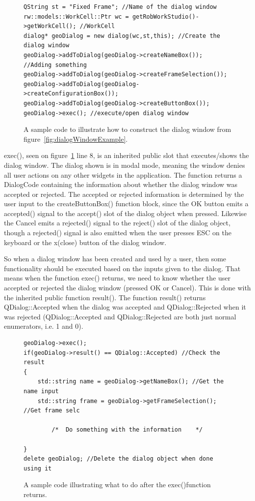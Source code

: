 \begin{figure}[h] %
\centering
\lstset{language=C++} 
\begin{lstlisting}[frame=single]  
QString st = "Fixed Frame"; //Name of the dialog window
rw::models::WorkCell::Ptr wc = getRobWorkStudio()->getWorkCell(); //WorkCell
dialog* geoDialog = new dialog(wc,st,this); //Create the dialog window
geoDialog->addToDialog(geoDialog->createNameBox()); //Adding something
geoDialog->addToDialog(geoDialog->createFrameSelection());
geoDialog->addToDialog(geoDialog->createConfigurationBox());
geoDialog->addToDialog(geoDialog->createButtonBox());	
geoDialog->exec(); //execute/open dialog window	 
\end{lstlisting}
\caption{A sample code to illustrate how to construct the dialog window from figure~\ref{fig:dialogWindowExample}.}
\label{fig:dialogWindowCode} 	
\end{figure}

exec(), seen on figure~\ref{fig:dialogWindowCode} line 8, is an inherited public slot that executes/shows the dialog window. The dialog shown is in modal mode, meaning the window denies all user actions on any other widgets in the application. The function returns a DialogCode containing the information about whether the dialog window was accepted or rejected. The accepted or rejected information is determined by the user input to the createButtonBox() function block, since the OK button emits a accepted() signal to the accept() slot of the dialog object when pressed. Likewise the Cancel emits a rejected() signal to the reject() slot of the dialog object, though a rejected() signal is also emitted when the user presses ESC on the keyboard or the x(close) button of the dialog window. 

So when a dialog window has been created and used by a user, then some functionality should be executed based on the inputs given to the dialog. That means when the function exec() returns, we need to know whether the user accepted or rejected the dialog window (pressed OK or Cancel). This is done with the inherited public function result(). The function result() returns QDialog::Accepted when the dialog was accepted and QDialog::Rejected when it was rejected (QDialog::Accepted and QDialog::Rejected are both just normal enumerators, i.e. 1 and 0). 

\begin{figure}[h] %
\centering
\lstset{language=C++} 
\begin{lstlisting}[frame=single]  
geoDialog->exec();
if(geoDialog->result() == QDialog::Accepted) //Check the result
{
	std::string name = geoDialog->getNameBox(); //Get the name input
	std::string frame = geoDialog->getFrameSelection(); //Get frame selc
											 
		/*	Do something with the information    */ 
		
}
delete geoDialog; //Delete the dialog object when done using it
\end{lstlisting}
\caption{A sample code illustrating what to do after the exec()function returns.}
\label{fig:dialogAcceptedRejectedCode} 	
\end{figure}

